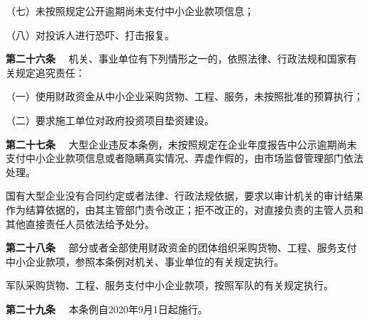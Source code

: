 （七）未按照规定公开逾期尚未支付中小企业款项信息；

（八）对投诉人进行恐吓、打击报复。

{ \bf 第二十六条 }　机关、事业单位有下列情形之一的，依照法律、行政法规和国家有关规定追究责任：

（一）使用财政资金从中小企业采购货物、工程、服务，未按照批准的预算执行；

（二）要求施工单位对政府投资项目垫资建设。

{ \bf 第二十七条 }　大型企业违反本条例，未按照规定在企业年度报告中公示逾期尚未支付中小企业款项信息或者隐瞒真实情况、弄虚作假的，由市场监督管理部门依法处理。

国有大型企业没有合同约定或者法律、行政法规依据，要求以审计机关的审计结果作为结算依据的，由其主管部门责令改正；拒不改正的，对直接负责的主管人员和其他直接责任人员依法给予处分。

{ \bf 第二十八条 }　部分或者全部使用财政资金的团体组织采购货物、工程、服务支付中小企业款项，参照本条例对机关、事业单位的有关规定执行。

军队采购货物、工程、服务支付中小企业款项，按照军队的有关规定执行。

{ \bf 第二十九条 }　本条例自2020年9月1日起施行。
